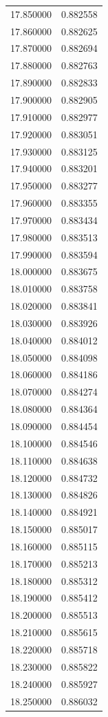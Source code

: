 \begin{tabular}{rr}
17.850000 & 0.882558 \\
17.860000 & 0.882625 \\
17.870000 & 0.882694 \\
17.880000 & 0.882763 \\
17.890000 & 0.882833 \\
17.900000 & 0.882905 \\
17.910000 & 0.882977 \\
17.920000 & 0.883051 \\
17.930000 & 0.883125 \\
17.940000 & 0.883201 \\
17.950000 & 0.883277 \\
17.960000 & 0.883355 \\
17.970000 & 0.883434 \\
17.980000 & 0.883513 \\
17.990000 & 0.883594 \\
18.000000 & 0.883675 \\
18.010000 & 0.883758 \\
18.020000 & 0.883841 \\
18.030000 & 0.883926 \\
18.040000 & 0.884012 \\
18.050000 & 0.884098 \\
18.060000 & 0.884186 \\
18.070000 & 0.884274 \\
18.080000 & 0.884364 \\
18.090000 & 0.884454 \\
18.100000 & 0.884546 \\
18.110000 & 0.884638 \\
18.120000 & 0.884732 \\
18.130000 & 0.884826 \\
18.140000 & 0.884921 \\
18.150000 & 0.885017 \\
18.160000 & 0.885115 \\
18.170000 & 0.885213 \\
18.180000 & 0.885312 \\
18.190000 & 0.885412 \\
18.200000 & 0.885513 \\
18.210000 & 0.885615 \\
18.220000 & 0.885718 \\
18.230000 & 0.885822 \\
18.240000 & 0.885927 \\
18.250000 & 0.886032 \\

\end{tabular}
